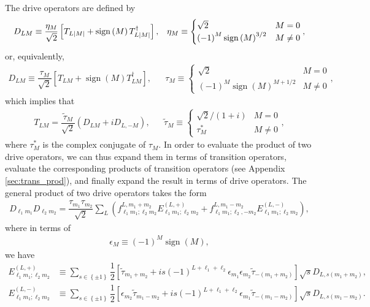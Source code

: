 \documentclass[nofootinbib,notitlepage,11pt]{revtex4-2}
\newcommand{\f}[2]{\dfrac{#1}{#2}} %
\newcommand{\p}[1]{\left(#1\right)} %
\renewcommand{\sp}[1]{\left[#1\right]} %
\renewcommand{\set}[1]{\left\{#1\right\}} %
\newcommand{\1}{\mathds{1}}
\DeclareMathOperator{\sign}{sign}
\begin{document}
The drive operators are defined by
\begin{align}
  D_{LM} \equiv \f{\eta_M}{\sqrt{2}}
  \sp{T_{L\abs{M}} + \sign\p{M} T_{L\abs{M}}^\dag},
  &&
  \eta_M \equiv
  \begin{cases}
    \sqrt{2} & M = 0 \\
    \p{-1}^M \sign\p{M}^{3/2} & M \ne 0
  \end{cases},
\end{align}
or, equivalently,
\begin{align}
  D_{LM} \equiv \f{\tau_M}{\sqrt{2}}
  \sp{T_{LM} + \sign\p{M} T_{LM}^\dag},
  &&
  \tau_M \equiv
  \begin{cases}
    \sqrt{2} & M = 0 \\
    \p{-1}^M \sign\p{M}^{M+1/2} & M \ne 0
  \end{cases},
\end{align}
which implies that
\begin{align}
  T_{LM} = \f{\tilde\tau_M}{\sqrt{2}} \p{D_{LM} + i D_{L,-M}},
  &&
  \tilde\tau_M \equiv
  \begin{cases}
    \sqrt{2}/\p{1+i} & M = 0 \\
    \tau_M^* & M \ne 0
  \end{cases},
\end{align}
where $\tau_M^*$ is the complex conjugate of $\tau_M$.  In order to
evaluate the product of two drive operators, we can thus expand them
in terms of transition operators, evaluate the corresponding products
of transition operators (see Appendix \ref{sec:trans_prod}), and
finally expand the result in terms of drive operators.  The general
product of two drive operators takes the form
\begin{align}
  D_{\ell_1 m_1} D_{\ell_2 m_2}
  = \f{\tau_{m_1}\tau_{m_2}}{\sqrt{2}}
  \sum_L \p{f_{\ell_1 m_1;\ell_2 m_2}^{L,m_1+m_2}
    E_{\ell_1 m_1;\ell_2 m_2}^{(L,+)}
    + f_{\ell_1 m_1;\ell_2,-m_2}^{L,m_1-m_2}
    E_{\ell_1 m_1;\ell_2 m_2}^{(L,-)}},
\end{align}
where in terms of
\begin{align}
  \epsilon_M \equiv \p{-1}^M \sign\p{M},
\end{align}
we have
\begin{align}
  E_{\ell_1 m_1;\ell_2 m_2}^{(L,+)}
  &\equiv \sum_{s\in\set{\pm1}}
  \f12 \sp{\tilde\tau_{m_1+m_2}
    + i s \p{-1}^{L+\ell_1+\ell_2}
    \epsilon_{m_1} \epsilon_{m_2} \tilde\tau_{-\p{m_1+m_2}}}
  \sqrt{s} D_{L,s\p{m_1+m_2}},
  \\
  E_{\ell_1 m_1;\ell_2 m_2}^{(L,-)}
  &\equiv \sum_{s\in\set{\pm1}}
  \f12 \sp{\epsilon_{m_2} \tilde\tau_{m_1-m_2}
    + i s \p{-1}^{L+\ell_1+\ell_2}
    \epsilon_{m_1} \tilde\tau_{-\p{m_1-m_2}}}
  \sqrt{s} D_{L,s\p{m_1-m_2}}.
\end{align}
\end{document}
